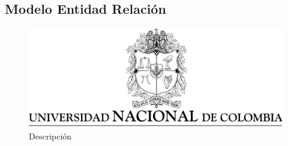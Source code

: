 \documentclass[a4paper,12 pt]{article}
\begin{document}
\begin{landscape}
\section{Modelo Entidad Relación}
    \begin{figure}[H]
        \centering
        \includegraphics[scale = 0.5]{images/escudoUN.png}
        \caption{Descripción}
        \label{F01}
    \end{figure}{}
\end{landscape}
\end{document}
